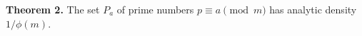 \textbf{Theorem 2.} The set $P_a$ of prime numbers $p \equiv a \pmod{m}$ has analytic density $1/\phi(m)$.
